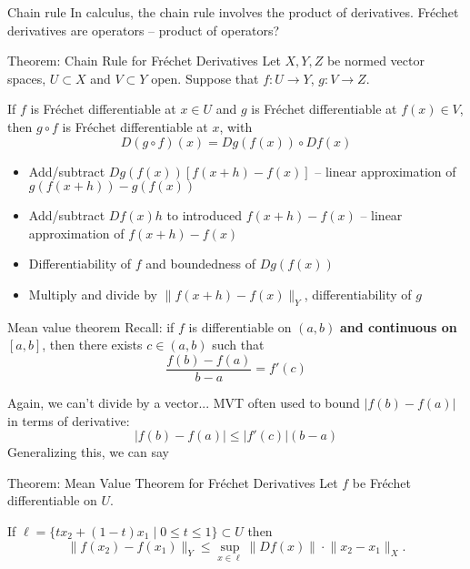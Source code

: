 \documentclass[]{beamer}
\begin{document}
	\begin{frame}{Chain rule}
		In calculus, the chain rule involves the product of derivatives. Fréchet derivatives are operators -- product of operators?
		\vfill
		\begin{block}{Theorem: Chain Rule for Fréchet Derivatives}
			Let $X,Y,Z$ be normed vector spaces, $U \subset X$ and $V \subset Y$ open. Suppose that $f : U \to Y$, $g : V \to Z$.
			\vspace{.7em}
			
			If $f$ is Fréchet differentiable at $x \in U$ and $g$ is Fréchet differentiable at $f(x) \in V$, then $g\circ f$ is Fréchet differentiable at $x$, with
			\begin{equation*}
				D(g\circ f)(x) = Dg(f(x)) \circ Df(x)
			\end{equation*}
		\end{block}
		\vfill
		{\small
		\begin{itemize}
			\item Add/subtract $Dg(f(x))[f(x+h) - f(x)]$ -- linear approximation of $g(f(x+h)) - g(f(x))$
			
			\item Add/subtract $Df(x)h$ to introduced $f(x+h) - f(x)$ -- linear approximation of $f(x+h)-f(x)$
			
			\item Differentiability of $f$ and boundedness of $Dg(f(x))$
			
			\item Multiply and divide by $\lVert f(x+h) - f(x)\rVert_Y$, differentiability of $g$
		\end{itemize}
		}
	\end{frame}
	
	\begin{frame}{Mean value theorem}
		Recall: if $f$ is differentiable on $(a,b)$ \textbf{and continuous on $[a,b]$}, then there exists $c \in (a,b)$ such that
		\begin{equation*}
			\frac{f(b) - f(a)}{b-a} = f'(c)
		\end{equation*}
		\vfill
		
		Again, we can't divide by a vector... MVT often used to bound $|f(b) - f(a)|$ in terms of derivative:
		\begin{equation*}
			|f(b) - f(a)| \le |f'(c)|(b-a)
		\end{equation*}
		Generalizing this, we can say
		\begin{block}{Theorem: Mean Value Theorem for Fréchet Derivatives}
			Let $f$ be Fréchet differentiable on $U$. 
			\vspace{0.5em}
			
			If $\ell = \{tx_2 + (1-t)x_1 \mid 0 \le t \le 1\}\subset U$ then
			\begin{equation*}
				\lVert f(x_2) - f(x_1)\rVert_Y \le \sup_{x\in \ell} \lVert Df(x)\rVert \cdot \lVert x_2 - x_1\rVert_X.
			\end{equation*}
		\end{block}
	\end{frame}
	
\end{document}
